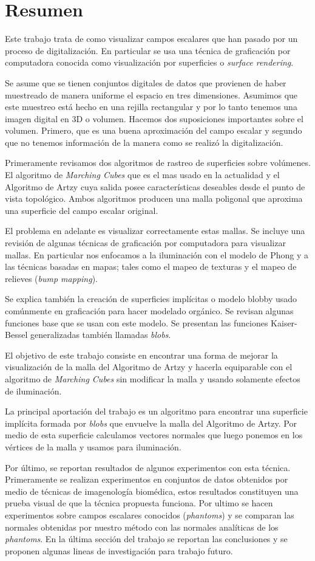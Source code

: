 \chapter*{Resumen}
Este trabajo trata de como visualizar campos escalares que han pasado por un proceso de digitalización. En particular se usa una técnica de graficación por computadora conocida como visualización por superficies o \emph{surface rendering}.

Se asume que se tienen conjuntos digitales de datos que provienen de haber muestreado de manera uniforme el espacio en tres dimensiones. Asumimos que este muestreo está hecho en una rejilla rectangular y por lo tanto tenemos una imagen digital en 3D o volumen. Hacemos dos suposiciones importantes sobre el volumen. Primero, que es una buena aproximación del campo escalar y segundo que no tenemos información de la manera como se realizó la digitalización.

Primeramente revisamos dos algoritmos de rastreo de superficies sobre volúmenes. El algoritmo de \emph{Marching Cubes} que es el mas usado en la actualidad y el Algoritmo de Artzy cuya salida posee características deseables desde el punto de vista topológico. Ambos algoritmos producen una malla poligonal que aproxima una superficie del campo escalar original.

El problema en adelante es visualizar correctamente estas mallas. Se incluye una revisión de algunas técnicas de graficación por computadora para visualizar mallas. En particular nos enfocamos a la iluminación con el modelo de Phong y a las técnicas basadas en mapas; tales como el mapeo de texturas y el mapeo de relieves (\emph{bump mapping}).

Se explica también la creación de superficies implícitas o modelo blobby usado comúnmente en graficación para hacer modelado orgánico. Se revisan algunas funciones base que se usan con este modelo. Se presentan las funciones Kaiser-Bessel generalizadas también llamadas \emph{blobs}.

El objetivo de este trabajo consiste en encontrar una forma de mejorar la visualización de la malla del Algoritmo de Artzy y hacerla equiparable con el algoritmo de \emph{Marching Cubes} sin modificar la malla y usando solamente efectos de iluminación.

La principal aportación del trabajo es un algoritmo para encontrar una superficie implícita formada por \emph{blobs} que envuelve la malla del Algoritmo de Artzy. Por medio de esta superficie calculamos vectores normales que luego ponemos en los vértices de la malla y usamos para iluminación.

Por último, se reportan resultados de algunos experimentos con esta técnica. Primeramente se realizan experimentos en conjuntos de datos obtenidos por medio de técnicas de imagenología biomédica, estos resultados constituyen una prueba visual de que la técnica propuesta funciona. Por ultimo se hacen experimentos sobre campos escalares conocidos (\emph{phantoms}) y se comparan las normales obtenidas por nuestro método con las normales analíticas de los \emph{phantoms}. En la última sección del trabajo se reportan las conclusiones y se proponen algunas lineas de investigación para trabajo futuro.